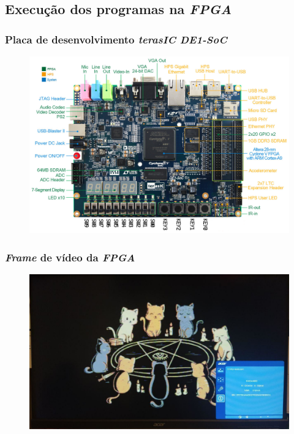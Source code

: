 \documentclass[aspectratio=169]{beamer}
\begin{document}
    \subsection{Execução dos programas na \textit{FPGA}}
    \begin{frame}
        \frametitle{Placa de desenvolvimento \textit{terasIC DE1-SoC}}
        \vfill
        \begin{figure}[H]
        \centering
            \includegraphics[width=.9\textwidth,height=.85\textheight,keepaspectratio]
            {../images/fpga/de1_soc_subs.png}
        \end{figure}
        \vfill
    \end{frame}

    \begin{frame}
        \frametitle{\textit{Frame} de vídeo da \textit{FPGA}}
        \vfill
        \begin{figure}[H]
        \centering
            \includegraphics[width=.9\textwidth,height=.85\textheight,keepaspectratio]
            {../images/osd/display.jpg}
        \end{figure}
        \vfill
    \end{frame}
\end{document}
